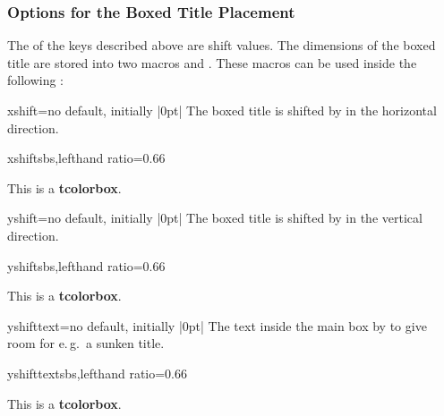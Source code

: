 \clearpage

\subsubsection{Options for the Boxed Title Placement}
The  of the keys described above are shift values.
The dimensions of the boxed title are stored into two macros
 and
. These macros can be used inside the
following :

\begin{boxTcbKey}{xshift}{=}{no default, initially |0pt|}
The boxed title is shifted by  in the horizontal direction.
\begin{exdispExample*}{xshift}{sbs,lefthand ratio=0.66}
\begin{tcolorbox}[enhanced,title=My title,
  attach boxed title to top left={xshift=-2mm},
  boxed title style={size=small,colback=blue}]
  This is a \textbf{tcolorbox}.
\end{tcolorbox}
\end{exdispExample*}
\end{boxTcbKey}

\begin{boxTcbKey}{yshift}{=}{no default, initially |0pt|}
The boxed title is shifted by  in the vertical direction.
\begin{exdispExample*}{yshift}{sbs,lefthand ratio=0.66}
\begin{tcolorbox}[enhanced,title=My title,
  attach boxed title to top center=
    {yshift=-\tcboxedtitleheight/2},
  boxed title style={size=small,colback=blue}]
  This is a \textbf{tcolorbox}.
\end{tcolorbox}
\end{exdispExample*}
\end{boxTcbKey}

\begin{boxTcbKey}{yshifttext}{=}{no default, initially |0pt|}
The text inside the main box by  to give room for e.\,g.\ a sunken title.
\begin{exdispExample*}{yshifttext}{sbs,lefthand ratio=0.66}
\begin{tcolorbox}[enhanced,title=My title,
  attach boxed title to top center=
    {yshift=-3mm,yshifttext=-1mm},
  boxed title style={size=small,colback=blue}]
  This is a \textbf{tcolorbox}.
\end{tcolorbox}
\end{exdispExample*}
\end{boxTcbKey}

